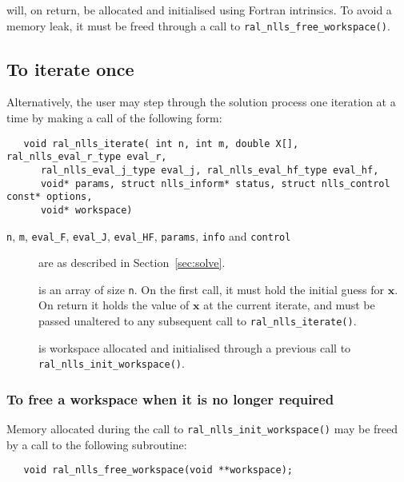 \documentclass{spec}
\begin{document}
\begin{description}
    will, on return, be allocated and initialised using Fortran intrinsics.
      To avoid a memory leak, it must be freed through a call to \texttt{ral\_nlls\_free\_workspace()}.
\end{description}

\subsection{To iterate once}
\label{sec:iterate}
Alternatively, the user may step through the solution process one iteration at
a time by making a call of the following form:

\begin{verbatim}
   void ral_nlls_iterate( int n, int m, double X[], ral_nlls_eval_r_type eval_r,
      ral_nlls_eval_j_type eval_j, ral_nlls_eval_hf_type eval_hf,
      void* params, struct nlls_inform* status, struct nlls_control const* options,
      void* workspace)
\end{verbatim}

\begin{description}

\item[\texttt{n}, \texttt{m}, \texttt{eval\_F}, \texttt{eval\_J}, \texttt{eval\_HF}, \texttt{params}, \texttt{info} and \texttt{control}] are as described in Section~\ref{sec:solve}.

 is an array of size {\tt n}. On the first call, it must hold the initial guess for
$\bm x$. On return it holds the value of $\bm x$ at the current iterate, and
must be passed unaltered to any subsequent call to \texttt{ral\_nlls\_iterate()}.

 is workspace allocated and initialised through a previous call to
\texttt{ral\_nlls\_init\_workspace()}.

\end{description}

\subsubsection{To free a workspace when it is no longer required}

Memory allocated during the call to \texttt{ral\_nlls\_init\_workspace()} may be freed
by a call to the following subroutine:
\begin{verbatim}
   void ral_nlls_free_workspace(void **workspace);
\end{verbatim}
\end{document}
